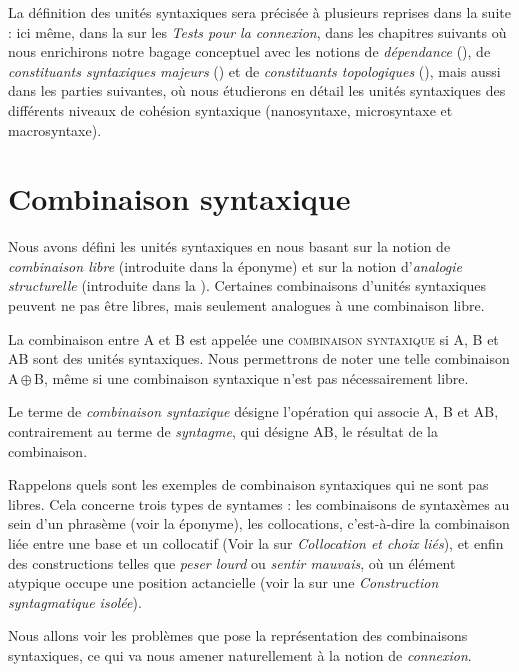 La définition des unités syntaxiques sera précisée à plusieurs reprises dans la suite : ici même, dans la  sur les \textit{Tests pour la connexion}, dans les chapitres suivants où nous enrichirons notre bagage conceptuel avec les notions de \textit{dépendance} (), de \textit{constituants syntaxiques majeurs} () et de \textit{constituants topologiques} (), mais aussi dans les parties suivantes, où nous étudierons en détail les unités syntaxiques des différents niveaux de cohésion syntaxique (nanosyntaxe, microsyntaxe et macrosyntaxe).

\section{Combinaison syntaxique}\label{sec:3.2-combinaison}
Nous avons défini les unités syntaxiques en nous basant sur la notion de \textit{combinaison libre} (introduite dans la  éponyme) et sur la notion d'\textit{analogie structurelle} (introduite dans la ). Certaines combinaisons d'unités syntaxiques peuvent ne pas être libres, mais seulement analogues à une combinaison libre.

{La combinaison entre A et B est appelée une \textsc{combinaison syntaxique} si A, B et AB sont des unités syntaxiques. Nous permettrons de noter une telle combinaison A\,${\oplus}$\,B, même si une combinaison syntaxique n'est pas nécessairement libre.}

Le terme de \textit{combinaison syntaxique} désigne l'opération qui associe A, B et AB, contrairement au terme de \textit{syntagme}, qui désigne AB, le résultat de la combinaison.

Rappelons quels sont les exemples de combinaison syntaxiques qui ne sont pas libres. Cela concerne trois types de syntames : les combinaisons de syntaxèmes au sein d'un phrasème (voir la  éponyme), les collocations, c'est-à-dire la combinaison liée entre une base et un collocatif (Voir la  sur \textit{Collocation et choix liés}), et enfin des constructions telles que \textit{peser lourd} ou \textit{sentir mauvais}, où un élément atypique occupe une position actancielle (voir la  sur une \textit{Construction syntagmatique isolée}).

Nous allons voir les problèmes que pose la représentation des combinaisons syntaxiques, ce qui va nous amener naturellement à la notion de \textit{connexion}.

